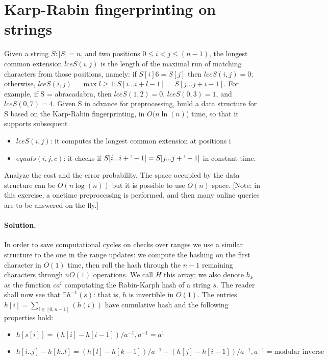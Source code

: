 \section{Karp-Rabin fingerprinting on strings}

Given a string $S: |S| = n$, and two positions $0 \leq i < j \leq (n - 1)$,
the longest common extension $lceS(i, j)$ is the length of the maximal run of matching
characters from those positions, namely: if $S[i] 6= S[j]$ then $lceS(i, j) = 0$;
otherwise, $lceS(i, j) = \max{l \geq 1 : S[i ... i + l - 1] = S[j ... j + i - 1]}$.
For example, if S = abracadabra, then $lceS(1, 2) = 0$, $lceS(0, 3) = 1$, and
$lceS(0, 7) = 4$.
Given S in advance for preprocessing, build a data structure for S based
on the Karp-Rabin fingerprinting, in $O(n \ln(n)$) time, so that it supports subsequent
    \begin{itemize}
    \item $lceS(i, j)$: it computes the longest common extension at positions i
    \item $equals (i, j, c)$: it checks if $S[i ... i + ` - 1] = S[j ... j + ` - 1]$ in constant time.
    \end{itemize}
Analyze the cost and the error probability.
The space occupied by the data structure can be $O(n \log(n))$ but it is possible
to use $O(n)$ space.
[Note: in this exercise, a onetime preprocessing is performed, and then many online
queries are to be answered on the fly.]

\vspace{0.5cm}
\paragraph{Solution.}
In order to save computational cycles on checks over ranges we use a similar structure
to the one in the range updates: we compute the hashing on the first character in $O(1)$
time, then roll the hash through the $n - 1$ remaining characters through $n O(1)$
operations.
We call $H$ this array; we also denote $h_k$ as the function $c a^{i}$ computating
the Rabin-Karph hash of a string $s$.
The reader shall now see that $\exists h^{-1}(s)$: that is, $h$ is invertible in $O(1)$.
The entries $h[i] = \sum_{i \in [0, n - 1]}(h(i))$ have cumulative hash and the following
properties hold:
    \begin{itemize}
    \item $h[s[i]] = (h[i] - h[i - 1]) / a^{-1}, a^{-1} = a^{1}$
    \item $h[i..j] - h[k..l] = (h[l] - h[k - 1]) / a^{-1} -
            (h[j] - h[i - 1]) / a^{-1}, a^{-1} = \textrm{modular inverse}$
    \end{itemize}

